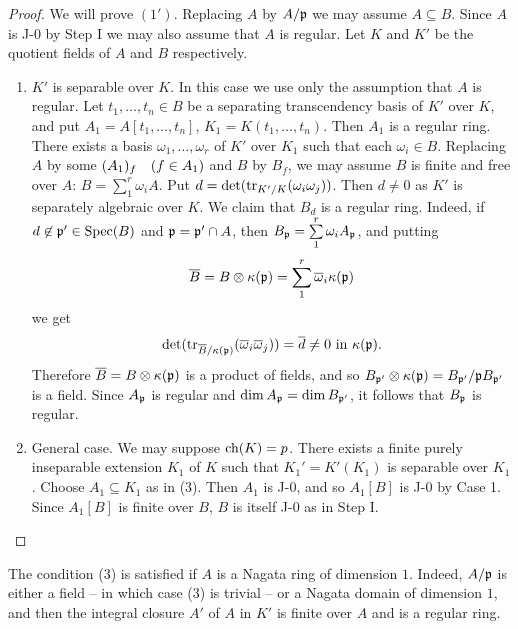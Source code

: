 \documentclass[../main]{subfiles}
\begin{document}
\begin{proof}
We will prove $(1')$. Replacing $A$ by $A/\mathfrak{p}$ we may assume $A \subseteq B$. Since $A$ is J-0 by Step I we may also assume that $A$ is regular. Let $K$ and $K'$ be the quotient fields of $A$ and $B$ respectively. 
\begin{enumerate}[label=Case \arabic*.]
    \item $K'$ is separable over $K$. In this case we use only the assumption that $A$ is regular. Let $t_1, \ldots, t_n \in B$ be a separating transcendency basis of $K'$ over $K$, and put $A_1 = A[t_1, \ldots, t_n]$, $K_1 = K(t_1, \ldots, t_n)$. Then $A_1$ is a regular ring. There exists a basis $\omega_1, \ldots, \omega_r$ of $K'$ over $K_1$ such that each $\omega_i \in B$. Replacing $A$ by some $(A_1)_f\for{f \in A_1}$ and $B$ by $B_f$, we may assume $B$ is finite and free over $A$: $B = \sum\limits_1^r \omega_i A$. Put $d = \det(\operatorname{tr}_{K'/K} (\omega_i \omega_j))$. Then $d \ne 0$ as $K'$ is separately algebraic over $K$. We claim that $B_d$ is a regular ring. Indeed, if $d \not \in {\mathfrak{p}}' \in \operatorname{Spec}(B)$ and $\mathfrak{p} = \mathfrak{p}' \cap A$, then $B_{\mathfrak{p}} = \sum\limits_1^r \omega_i A_{\mathfrak{p}}$, and putting \[\overline B = B \otimes \kappa(\mathfrak{p}) = \sum\limits_1^r \overline \omega_i \kappa(\mathfrak{p})\] we get \[\det(\operatorname{tr}_{\overline B/\kappa(\mathfrak{p})} (\overline \omega_i \overline \omega_j)) = \overline d \ne 0\text{ in }\kappa(\mathfrak{p}).\] Therefore $\overline B = B \otimes \kappa(\mathfrak{p})$ is a product of fields, and so $B_{\mathfrak{p}'} \otimes \kappa(\mathfrak{p}) = B_{\mathfrak{p}'}/\mathfrak{p} B_{\mathfrak{p}'}$ is a field. Since $A_{\mathfrak{p}}$ is regular and $\operatorname{dim} A_{\mathfrak{p}} = \operatorname{dim} B_{\mathfrak{p}'}$, it follows that $B_{\mathfrak{p}}$ is regular. 
    \item General case. We may suppose $\operatorname{ch}(K) = p$. There exists a finite purely inseparable extension $K_1$ of $K$ such that $K_1' = K'(K_1)$ is separable over $K_1$. Choose $A_1 \subseteq K_1$ as in (3). Then $A_1$ is J-0, and so $A_1[B]$ is J-0 by Case 1. Since $A_1[B]$ is finite over $B$, $B$ is itself J-0 as in Step I.
\end{enumerate}
\end{proof}

\begin{remark}
The condition (3) is satisfied if $A$ is a Nagata ring of dimension $1$. Indeed, $A/\mathfrak{p}$ is either a field -- in which case (3) is trivial -- or a Nagata domain of dimension $1$, and then the integral closure $A'$ of $A$ in $K'$ is finite over $A$ and is a regular ring. 
\end{remark}
\end{document}
